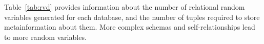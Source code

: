 \documentclass{acm_proc_article-sp}
\begin{document}
\begin{table}[hbtp] \centering
\caption{Datasets characteristics. \#Tuples = total number of tuples over all tables in the dataset. 
  \label{table:datasetsize}}
\end{table}



Table~\ref{tab:rvd} provides information about the number of relational random variables generated for each database, and the number of tuples required to store metainformation about them. More complex schemas and self-relationships lead to more random variables. 
%
\end{document}
